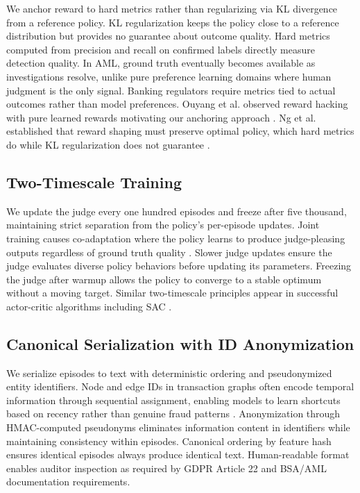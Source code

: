 \documentclass[11pt,a4paper]{article}
\begin{document}
We anchor reward to hard metrics rather than regularizing via KL divergence from a reference policy. KL regularization keeps the policy close to a reference distribution but provides no guarantee about outcome quality. Hard metrics computed from precision and recall on confirmed labels directly measure detection quality. In AML, ground truth eventually becomes available as investigations resolve, unlike pure preference learning domains where human judgment is the only signal. Banking regulators require metrics tied to actual outcomes rather than model preferences. Ouyang et al. observed reward hacking with pure learned rewards motivating our anchoring approach \citep{ouyang2022training}. Ng et al. established that reward shaping must preserve optimal policy, which hard metrics do while KL regularization does not guarantee \citep{ng1999policy}.

\subsection{Two-Timescale Training}

We update the judge every one hundred episodes and freeze after five thousand, maintaining strict separation from the policy's per-episode updates. Joint training causes co-adaptation where the policy learns to produce judge-pleasing outputs regardless of ground truth quality \citep{levine2020offline}. Slower judge updates ensure the judge evaluates diverse policy behaviors before updating its parameters. Freezing the judge after warmup allows the policy to converge to a stable optimum without a moving target. Similar two-timescale principles appear in successful actor-critic algorithms including SAC \citep{haarnoja2018soft}.

\subsection{Canonical Serialization with ID Anonymization}

We serialize episodes to text with deterministic ordering and pseudonymized entity identifiers. Node and edge IDs in transaction graphs often encode temporal information through sequential assignment, enabling models to learn shortcuts based on recency rather than genuine fraud patterns \citep{weber2019anti}. Anonymization through HMAC-computed pseudonyms eliminates information content in identifiers while maintaining consistency within episodes. Canonical ordering by feature hash ensures identical episodes always produce identical text. Human-readable format enables auditor inspection as required by GDPR Article 22 and BSA/AML documentation requirements.
\end{document}
